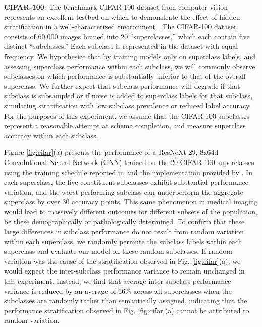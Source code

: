 \documentclass[sigconf,anonymous,review]{acmart}
\begin{document}
\textbf{CIFAR-100}: The benchmark CIFAR-100 dataset from computer vision represents an excellent testbed on which to demonstrate the effect of hidden stratification in a well-characterized environment \citep{Krizhevsky2009-tq}.  
The CIFAR-100 dataset consists of 60,000 images binned into 20 ``superclasses,'' which each contain five distinct ``subclasses.'' 
 Each subclass is represented in the dataset with equal frequency.  
 We hypothesize that by training models only on superclass labels, and assessing superclass performance within each subclass, we will commonly observe subclasses on which performance is substantially inferior to that of the overall superclass.  
  We further expect that subclass performance will degrade if that subclass is subsampled or if noise is added to superclass labels for that subclass, simulating stratification with low subclass prevalence or reduced label accuracy.
 For the purposes of this experiment, we assume that the CIFAR-100 subclasses represent a reasonable attempt at schema completion, and measure superclass accuracy within each subclass.
 
 Figure \ref{fig:cifar}(a) presents the performance of a ResNeXt-29, 8x64d Convolutional Neural Network (CNN) trained on the 20 CIFAR-100 superclasses using the training schedule reported in \citep{Xie2016-ip} and the implementation provided by \citep{Yang_undated-bt}.  
In each superclass, the five constituent subclasses exhibit substantial performance variation, and the worst-performing subclass can underperform the aggregate superclass by over 30 accuracy points.  
This same phenomenon in medical imaging would lead to massively different outcomes for different subsets of the population, be these demographically or pathologically determined.
To confirm that these large differences in subclass performance do not result from random variation within each superclass, we randomly permute the subclass labels within each superclass and evaluate our model on these random subclasses.
If random variation was the cause of the stratification observed in Fig. \ref{fig:cifar}(a), we would expect the inter-subclass performance variance to remain unchanged in this experiment.
 Instead, we find that average inter-subclass performance variance is reduced by an average of 66\% across all superclasses when the subclasses are randomly rather than semantically assigned, indicating that the performance stratification observed in Fig. \ref{fig:cifar}(a) cannot be attributed to random variation.
\end{document}
